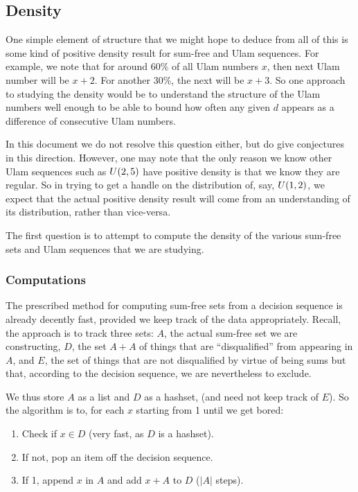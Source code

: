 \documentclass{article}
\theoremstyle{definition}
\theoremstyle{remark}
\numberwithin{equation}{section}
\begin{document}
\subsection{Density}

One simple element of structure that we might hope to deduce from all
of this is some kind of positive density result for sum-free and Ulam
sequences.  For example, we note that for around 60\% of all Ulam
numbers $x$, then next Ulam number will be $x+2$.  For another 30\%,
the next will be $x+3$.  So one approach to studying the density would
be to understand the structure of the Ulam numbers well enough to be
able to bound how often any given $d$ appears as a difference of
consecutive Ulam numbers.

In this document we do not resolve this question either, but do give
conjectures in this direction.  However, one may note that the only
reason we know other Ulam sequences such as $U(2,5)$ have
positive density is that we know they are regular.  So in trying to
get a handle on the distribution of, say, $U(1,2)$, we expect
that the actual positive density result will come from an
understanding of its distribution, rather than vice-versa.

The first question is to attempt to compute the density of the various
sum-free sets and Ulam sequences that we are studying.  

\subsubsection{Computations}

The prescribed method for computing sum-free sets from a decision
sequence is already decently fast, provided we keep track of the data
appropriately.  Recall, the approach is to track three sets: $A$, the
actual sum-free set we are constructing, $D$, the set $A+A$ of things
that are ``disqualified'' from appearing in $A$, and $E$, the set of
things that are not disqualified by virtue of being sums but that,
according to the decision sequence, we are nevertheless to exclude.

We thus store $A$ as a list and $D$ as a hashset, (and need not keep
track of $E$).  So the algorithm is to, for each $x$ starting from 1
until we get bored:

\begin{enumerate}
\item Check if $x \in D$ (very fast, as $D$ is a hashset).  
\item If not, pop an item off the decision sequence.  
\item If 1, append $x$ in $A$ and add $x + A$ to $D$ ($|A|$ steps).
\end{enumerate}
\end{document}
